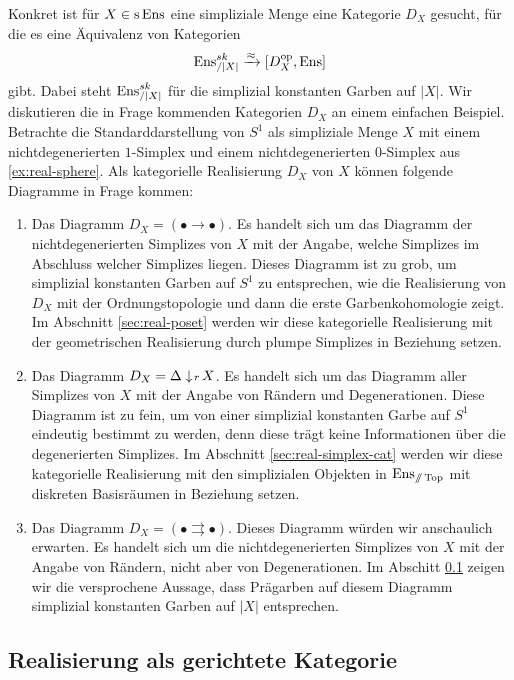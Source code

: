Konkret ist für $X \in \operatorname{s}\operatorname{Ens}$ eine simpliziale Menge eine Kategorie
$D_X$ gesucht, für die es eine Äquivalenz von Kategorien
\[ \operatorname{Ens}_{/|X|}^{sk} \xrightarrow{\approx} {[D_X^\mathrm{op}, \operatorname{Ens}]} \]
gibt. Dabei steht $\operatorname{Ens}_{/|X|}^{sk}$ für die simplizial konstanten
Garben auf $|X|$. Wir diskutieren die in Frage kommenden Kategorien
$D_X$ an einem einfachen Beispiel. Betrachte die Standarddarstellung
von $S^1$ als simpliziale Menge $X$ mit einem nichtdegenerierten
$1$-Simplex und einem nichtdegenerierten $0$-Simplex aus
\ref{ex:real-sphere}. Als kategorielle Realisierung $D_X$ von $X$
können folgende Diagramme in Frage kommen:
\begin{enumerate}
\item Das Diagramm $D_X = (\bullet \to \bullet)$. Es handelt sich um
  das Diagramm der nichtdegenerierten Simplizes von $X$ mit der
  Angabe, welche Simplizes im Abschluss welcher Simplizes
  liegen. Dieses Diagramm ist zu grob, um simplizial konstanten Garben
  auf $S^1$ zu entsprechen, wie die Realisierung von $D_X$ mit der
  Ordnungstopologie und dann die erste Garbenkohomologie zeigt. Im
  Abschnitt \ref{sec:real-poset} werden wir diese kategorielle
  Realisierung mit der geometrischen Realisierung durch plumpe
  Simplizes in Beziehung setzen.
\item Das Diagramm $D_X = \Delta \downarrow \! {\scriptstyle r} \, X$. Es handelt sich um
  das Diagramm aller Simplizes von $X$ mit der Angabe von Rändern und
  Degenerationen. Diese Diagramm ist zu fein, um von einer simplizial
  konstanten Garbe auf $S^1$ eindeutig bestimmt zu werden, denn diese
  trägt keine Informationen über die degenerierten Simplizes. Im
  Abschnitt \ref{sec:real-simplex-cat} werden wir diese kategorielle
  Realisierung mit den simplizialen Objekten in $\operatorname{Ens}_{\mathbin{/\mkern-6mu/} \operatorname{Top}}$ mit
  diskreten Basisräumen in Beziehung setzen.
\item Das Diagramm $D_X = (\bullet \rightrightarrows \bullet)$. Dieses
  Diagramm würden wir anschaulich erwarten. Es handelt sich um die
  nichtdegenerierten Simplizes von $X$ mit der Angabe von Rändern,
  nicht aber von Degenerationen. Im Abschitt
  \ref{sec:real-directed-cat} zeigen wir die versprochene Aussage,
  dass Prägarben auf diesem Diagramm simplizial konstanten Garben auf
  $|X|$ entsprechen.
\end{enumerate}

\subsection{Realisierung als gerichtete Kategorie}
\label{sec:real-directed-cat}

